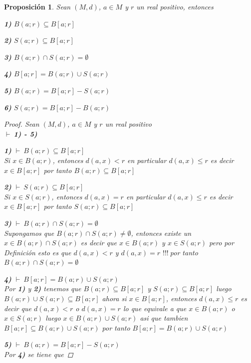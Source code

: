 \documentclass[oneside]{book} %
\theoremstyle{Teorema}
\newtheorem{Proposicion}[Definicion]{Proposición}
\theoremstyle{Ejemplos}
\theoremstyle{[Obs]}
\renewcommand{\{}{\left\lbrace} %
\renewcommand{\}}{\right\rbrace} %
\renewcommand{\u}{\cup} %
\newcommand{\n}{\cap} %
\renewcommand{\sc}{\subseteq} %
\newcommand{\pd}{$\vdash\ $} %
\renewcommand{\c}{$!!!\ $} %
\begin{document}
			\begin{Proposicion}\setlength{\parindent}{0em}
				
				Sean $(M, d)$, $a \in M$ y $r$ un real positivo, entonces

				\textbf{1)} $B(a;r) \sc B[a;r]$ 

				\textbf{2)} $S(a;r) \sc B[a;r]$ 

				\textbf{3)} $B(a;r) \n S(a;r) = \emptyset$ 

				\textbf{4)} $B[a;r] = B(a;r) \u S(a;r)$ 

				\textbf{5)} $B(a;r) = B[a;r] - S(a;r)$ 

				\textbf{6)} $S(a;r) = B[a;r] - B(a;r)$ 

				\begin{proof}
					
					Sean $(M, d)$, $a \in M$ y $r$ un real positivo \\
					\pd \textbf{1) - 5)}

					\textbf{1)} \pd $B(a;r) \sc B[a;r]$ \\
					Si $x \in B(a;r)$, entonces $d(a, x) < r$ en particular $d(a, x) \leq r$ es decir $x \in B[a;r]$ por tanto $B(a;r) \sc B[a;r]$

					\textbf{2)} \pd $S(a;r) \sc B[a;r]$ \\
					Si $x \in S(a;r)$, entonces $d(a, x) = r$ en particular $d(a, x) \leq r$ es decir $x \in B[a;r]$ por tanto $S(a;r) \sc B[a;r]$

					\textbf{3)} \pd $B(a;r) \n S(a;r) = \emptyset$ \\
					Supongamos que $B(a;r) \n S(a;r) \neq \emptyset$, entonces existe un $x \in B(a;r) \n S(a;r)$ es decir que $x \in B(a;r)$ y $x \in S(a;r)$ pero por Definición esto es que $d(a, x) < r$ y $d(a, x) = r$ \c por tanto $B(a;r) \n S(a;r) = \emptyset$

					\textbf{4)} \pd $B[a;r] = B(a;r) \u S(a;r)$ \\
					Por \textbf{1)} y \textbf{2)} tenemos que $B(a;r) \sc B[a;r]$ y $S(a;r) \sc B[a;r]$ luego $B(a;r) \u S(a;r) \sc B[a;r]$ ahora si $x \in B[a;r]$, entonces $d(a, x) \leq r$ es decir que $d(a, x) < r$ o $d(a, x) = r$ lo que equivale a que $x \in B(a;r)$ o $x \in S(a;r)$ luego $x \in B(a;r) \u S(a;r)$ asi que tambien $B[a;r] \sc B(a;r) \u S(a;r)$ por tanto $B[a;r] = B(a;r) \u S(a;r)$

					\textbf{5)} \pd $B(a;r) = B[a;r] - S(a;r)$ \\ 
					Por \textbf{4)} se tiene que 
					

\end{proof}
\end{Proposicion}
\end{document}
